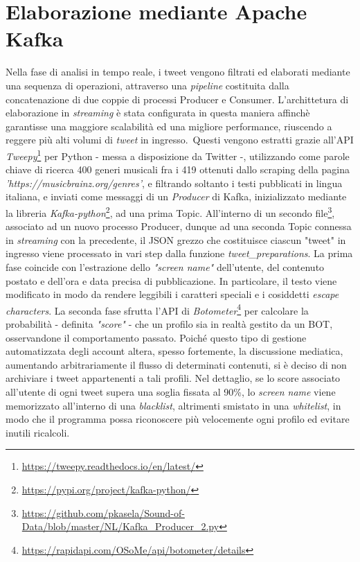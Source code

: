 \documentclass[12pt, a4paper, twocolumn]{article} %
\begin{document}
\section{Elaborazione mediante Apache Kafka}
Nella fase di analisi in tempo reale, i tweet vengono filtrati ed elaborati mediante una sequenza di operazioni, attraverso una \textit{pipeline} costituita dalla concatenazione di due coppie di processi Producer e Consumer. L'archittetura di elaborazione in \textit{streaming} è stata configurata in questa maniera affinchè garantisse una maggiore scalabilità ed una migliore performance, riuscendo a reggere più alti volumi di \textit{tweet} in ingresso.\ 
Questi vengono estratti grazie all'API \textit{Tweepy}\footnote{\url{https://tweepy.readthedocs.io/en/latest/}} per Python - messa a disposizione da Twitter -, utilizzando come parole chiave di ricerca 400 generi musicali fra i 419 ottenuti dallo scraping della pagina \textit{'https://musicbrainz.org/genres'}, e filtrando soltanto i testi pubblicati in lingua italiana, e inviati come messaggi di un \textit{Producer} di Kafka, inizializzato mediante la libreria \textit{Kafka-python}\footnote{\url{https://pypi.org/project/kafka-python/}}, ad una prima Topic. 
All'interno di un secondo file\footnote{\url{https://github.com/pkasela/Sound-of-Data/blob/master/NL/Kafka_Producer_2.py}}, associato ad un nuovo processo Producer, dunque ad una seconda Topic connessa in \textit{streaming} con la precedente, il JSON grezzo che costituisce ciascun "tweet" in ingresso viene processato in vari step dalla funzione \textit{tweet\_preparations}. La prima fase coincide con l'estrazione dello \textit{"screen name"} dell'utente, del contenuto postato e dell'ora e data precisa di pubblicazione. 
In particolare, il testo viene modificato in modo da rendere leggibili i caratteri speciali e i cosiddetti \textit{escape characters}. 
La seconda fase sfrutta l'API di \textit{Botometer}\footnote{\url{https://rapidapi.com/OSoMe/api/botometer/details}} per calcolare la probabilità - definita \textit{"score"} - che un profilo sia in realtà gestito da un BOT, osservandone il comportamento passato.
Poiché questo tipo di gestione automatizzata degli account altera, spesso fortemente, la discussione mediatica, aumentando arbitrariamente il flusso di determinati contenuti, si è deciso di non archiviare i tweet appartenenti a tali profili. 
Nel dettaglio, se lo score associato all'utente di ogni tweet supera una soglia fissata al 90\%, lo \textit{screen name} viene memorizzato all'interno di una \textit{blacklist}, altrimenti smistato in una \textit{whitelist}, in modo che il programma possa riconoscere più velocemente ogni profilo ed evitare inutili ricalcoli. 
\end{document}
